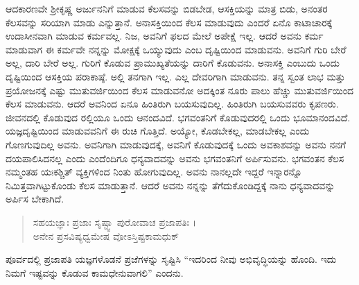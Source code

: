 ಆದಕಾರಣವೇ ಶ್ರೀಕೃಷ್ಣ ಅರ್ಜುನನಿಗೆ ಮಾಡುವ ಕೆಲಸವನ್ನು ಬಿಡಬೇಡ, ಆಸಕ್ತಿಯನ್ನು ಮಾತ್ರ ಬಿಡು, ಅನಂತರ ಕೆಲಸವನ್ನು ಸರಿಯಾಗಿ ಮಾಡು ಎನ್ನುತ್ತಾನೆ. ಅನಾಸಕ್ತಿಯಿಂದ ಕೆಲಸ ಮಾಡುವುದು ಎಂದರೆ ಏನೊ ಕಾಟಾಚಾರಕ್ಕೆ ಉದಾಸೀನವಾಗಿ ಮಾಡುವ ಕರ್ಮವಲ್ಲ. ನಿಜ, ಅವನಿಗೆ ಫಲದ ಮೇಲೆ ಅಪೇಕ್ಷೆ ಇಲ್ಲ. ಆದರೆ ಅವನು ಕರ್ಮ ಮಾಡುವಾಗ ಈ ಕರ್ಮವೇ ನನ್ನನ್ನು ಮೋಕ್ಷಕ್ಕೆ ಒಯ್ಯುವುದು ಎಂಬ ದೃಷ್ಟಿಯಿಂದ ಮಾಡುವನು. ಅವನಿಗೆ ಗುರಿ ಬೇರೆ ಅಲ್ಲ, ದಾರಿ ಬೇರೆ ಅಲ್ಲ. ಗುರಿಗೆ ಕೊಡುವ ಪ್ರಾಮುಖ್ಯತೆಯನ್ನು ದಾರಿಗೆ ಕೊಡುವನು. ಅನಾಸಕ್ತಿ ಎಂಬುದು ಒಂದು ದೃಷ್ಟಿಯಿಂದ ಆಸಕ್ತಿಯ ಪರಾಕಾಷ್ಠೆ. ಅಲ್ಲಿ ತನಗಾಗಿ ಇಲ್ಲ. ಎಲ್ಲ ದೇವರಿಗಾಗಿ ಮಾಡುವನು. ತನ್ನ ಸ್ವಂತ ಲಾಭ ಮತ್ತು ಪ್ರಯೋಜನಕ್ಕೆ ಎಷ್ಟು ಮುತುವರ್ಜಿಯಿಂದ ಕೆಲಸ ಮಾಡುವನೋ ಅದಕ್ಕಿಂತ ನೂರು ಪಾಲು ಹೆಚ್ಚು ಮುತುವರ್ಜಿಯಿಂದ ಕೆಲಸ ಮಾಡುವನು. ಆದರೆ ಅವನಿಂದ ಏನೂ ಹಿಂತಿರುಗಿ ಬಯಸುವುದಿಲ್ಲ. ಹಿಂತಿರುಗಿ ಬಯಸುವವರು ಕೃಪಣರು. ಜೀವನದಲ್ಲಿ ಕೊಡುವುದ ರಲ್ಲಿಯೂ ಒಂದು ಆನಂದವಿದೆ. ಭಗವಂತನಿಗೆ ಕೊಡುವುದರಲ್ಲಿ ಒಂದು ಭೂಮಾನಂದವಿದೆ. ಯಜ್ಞದೃಷ್ಟಿಯಿಂದ ಮಾಡುವವನಿಗೆ ಈ ರುಚಿ ಗೊತ್ತಿದೆ. ಅಯ್ಯೋ, ಕೊಡಬೇಕಲ್ಲ, ಮಾಡಬೇಕಲ್ಲ ಎಂದು ಗೊಣಗುವುದಿಲ್ಲ ಅವನು. ಅವನಿಗಾಗಿ ಮಾಡುವುದಕ್ಕೆ, ಅವನಿಗೆ ಕೊಡುವುದಕ್ಕೆ ಒಂದು ಅವಕಾಶವನ್ನು ಅವನು ನನಗೆ ದಯಪಾಲಿಸಿದನಲ್ಲ ಎಂದು ಎಂದೆಂದಿಗೂ ಧನ್ಯವಾದವನ್ನು ಅವನು ಭಗವಂತನಿಗೆ ಅರ್ಪಿಸುವನು. ಭಗವಂತನ ಕೆಲಸ ನಮ್ಮಂತಹ ಯಃಕಶ್ಚಿತ್ ವ್ಯಕ್ತಿಗಳಿಂದ ನಿಂತು ಹೋಗುವುದಿಲ್ಲ. ಅವನು ನಾನಲ್ಲದೇ ಇದ್ದರೆ ಇನ್ನಾರನ್ನೊ ನಿಮಿತ್ತವಾಗಿಟ್ಟುಕೊಂಡು ಕೆಲಸ ಮಾಡುತ್ತಾನೆ. ಆದರೆ ಅವನು ನನ್ನನ್ನು ತೆಗೆದುಕೊಂಡಿದ್ದಕ್ಕೆ ನಾನು ಧನ್ಯವಾದವನ್ನು ಅರ್ಪಿಸ ಬೇಕಾಗಿದೆ.

\begin{verse}
ಸಹಯಜ್ಞಾಃ ಪ್ರಜಾಃ ಸೃಷ್ಟ್ವಾ ಪುರೋವಾಚ ಪ್ರಜಾಪತಿಃ ।\\ಅನೇನ ಪ್ರಸವಿಷ್ಯಧ್ವಮೇಷ ವೋಽಸ್ತಿಷ್ಟಕಾಮಧುಕ್ 
\end{verse}

{\small ಪೂರ್ವದಲ್ಲಿ ಪ್ರಜಾಪತಿ ಯಜ್ಞಗಳೊಡನೆ ಪ್ರಜೆಗಳನ್ನು ಸೃಷ್ಟಿಸಿ “ಇದರಿಂದ ನೀವು ಅಭಿವೃದ್ಧಿಯನ್ನು ಹೊಂದಿ. ಇದು ನಿಮಗೆ ಇಷ್ಟವನ್ನು ಕೊಡುವ ಕಾಮಧೇನುವಾಗಲಿ” ಎಂದನು.}

